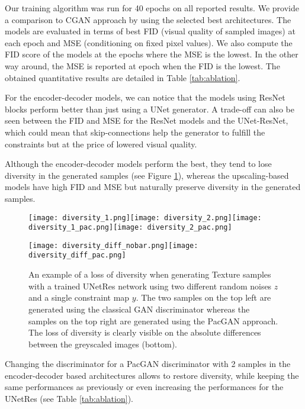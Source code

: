 Our training algorithm was run for 40 epochs on all reported results. We provide a comparison to CGAN\citep{Mirza2014} approach by using the selected best architectures.
The models are evaluated in terms of best FID (visual quality of sampled images) at each epoch and MSE (conditioning on fixed pixel values).  We also compute the FID score of the models at the epochs where the MSE is the lowest. In the other way around, the MSE is reported at epoch when the FID is the lowest. The obtained quantitative results are detailed in Table \ref{tab:ablation}.

For the encoder-decoder models, we can notice that the models using ResNet blocks perform better than just using a UNet generator. A trade-off can also be seen between the FID and MSE for the ResNet models and the UNet-ResNet, which could mean that skip-connections help the generator to fulfill the constraints but at the price of lowered visual quality.

Although the encoder-decoder models perform the best, they tend to lose diversity in the generated samples (see Figure \ref{fig:diversity_loss}), whereas the upscaling-based models have high FID and MSE but naturally preserve diversity in the generated samples.

\begin{figure}
	\centering
	\texttt{[image: diversity\_1.png]}\hspace{0.5cm}\texttt{[image: diversity\_2.png]}\hspace{0.5cm}\texttt{[image: diversity\_1\_pac.png]}\hspace{0.5cm}\texttt{[image: diversity\_2\_pac.png]}
	
	\vspace{0.3cm}
	\texttt{[image: diversity\_diff\_nobar.png]}\hspace{0.5cm}\texttt{[image: diversity\_diff\_pac.png]}
	\caption{An example of a loss of diversity when generating Texture samples with a trained UNetRes network using two different random noises $z$ and a single constraint map $y$. The two samples on the top left are generated using the classical GAN discriminator whereas the samples on the top right are generated using the PacGAN approach. The loss of diversity is clearly visible on the absolute differences between the greyscaled images (bottom).}
	\label{fig:diversity_loss}
\end{figure}

Changing the discriminator for a PacGAN discriminator with 2 samples in the encoder-decoder based architectures allows to restore diversity, while keeping the same performances as previously or even increasing the performances for the UNetRes (see Table \ref{tab:ablation}).

